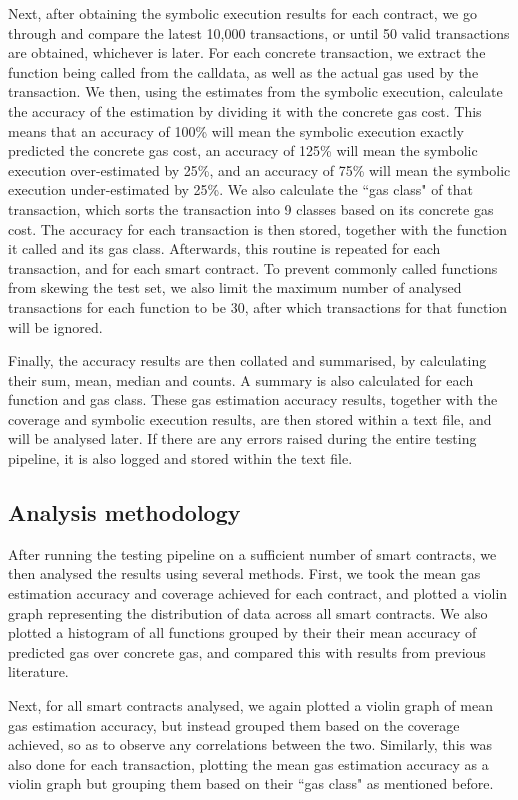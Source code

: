 Next, after obtaining the symbolic execution results for each contract, we go through and compare the latest 
10,000 transactions, or until 50 valid transactions are obtained, whichever is later. For each concrete
transaction, we extract the function being called from the calldata, as well as the actual gas used
by the transaction. We then, using the estimates from the symbolic execution, calculate the
accuracy of the estimation by dividing it with the concrete gas cost. This means that an accuracy
of 100\% will mean the symbolic execution exactly predicted the concrete gas cost, an accuracy of 125\%
will mean the symbolic execution over-estimated by 25\%, and an accuracy of 75\% will mean the
symbolic execution under-estimated by 25\%. We also calculate the ``gas class" of that transaction,
which sorts the transaction into 9 classes based on its concrete gas cost.
The accuracy for each transaction is then stored, together
with the function it called and its gas class. Afterwards, this routine is repeated for each transaction,
and for each smart contract.
To prevent commonly called functions from skewing the test set, we also limit the maximum number of
analysed transactions for each function to be 30, after which transactions for that function will be ignored.

Finally, the accuracy results are then collated and summarised, by calculating their sum, mean, median
and counts. A summary is also calculated for each function and gas class.
These gas estimation accuracy results, together with the coverage and symbolic execution results, are then stored within a text file,
and will be analysed later. If there are any errors raised
during the entire testing pipeline, it is also logged and stored within the text file.

\subsection{Analysis methodology}

After running the testing pipeline on a sufficient number of smart contracts, we then analysed the 
results using several methods. First, we took the mean gas estimation accuracy and
coverage achieved for each contract, and plotted a violin graph representing the distribution
of data across all smart contracts. We also plotted a histogram of all functions grouped by their
their mean accuracy of predicted gas over concrete gas, and compared this with results from previous literature.

Next, for all smart contracts analysed, we again plotted a violin
graph of mean gas estimation accuracy, but instead grouped them based on the coverage achieved, so
as to observe any correlations between the two. Similarly, this was also done for each transaction,
plotting the mean gas estimation accuracy as a violin graph but grouping them based on their 
``gas class" as mentioned before.

